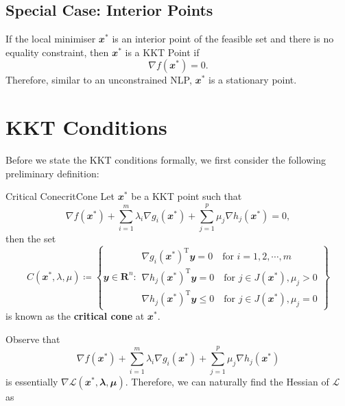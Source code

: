 \documentclass[math, code]{amznotes}
\theoremstyle{remark}
\begin{document}
\subsection{Special Case: Interior Points}
If the local minimiser $\mathbfit{x}^*$ is an interior point of the feasible set and there is no equality constraint, then $\mathbfit{x}^*$ is a KKT Point if 
\begin{equation*}
    \nabla f(\mathbfit{x}^*) = 0.
\end{equation*}
Therefore, similar to an unconstrained NLP, $\mathbfit{x}^*$ is a stationary point.

\section{KKT Conditions}
Before we state the KKT conditions formally, we first consider the following preliminary definition:
\begin{dfnbox}{Critical Cone}{critCone}
    Let $\mathbfit{x}^*$ be a KKT point such that
    \begin{equation*}
        \nabla f(\mathbfit{x}^*) + \sum_{i = 1}^{m}\lambda_i\nabla g_i(\mathbfit{x}^*) + \sum_{j = 1}^{p}\mu_j\nabla h_j(\mathbfit{x}^*) = \mathbfit{0},
    \end{equation*}
    then the set
    \begin{equation*}
        C(\mathbfit{x}^*, \lambda, \mu) \coloneqq \left\{\mathbfit{y} \in \mathbf{R}^n \colon \begin{array}{l}
            \nabla g_i(\mathbfit{x}^*)^{\mathrm{T}}\mathbfit{y} = 0 \quad\textrm{for } i = 1, 2, \cdots, m \\
            \nabla h_j(\mathbfit{x}^*)^{\mathrm{T}}\mathbfit{y} = 0 \quad\textrm{for } j \in J(\mathbfit{x^*}), \mu_j > 0 \\
            \nabla h_j(\mathbfit{x}^*)^{\mathrm{T}}\mathbfit{y} \leq 0 \quad\textrm{for } j \in J(\mathbfit{x^*}), \mu_j = 0
        \end{array}\right\}
    \end{equation*}
    is known as the {\color{red} \textbf{critical cone}} at $\mathbfit{x}^*$.
\end{dfnbox}
Observe that
\begin{equation*}
    \nabla f(\mathbfit{x}^*) + \sum_{i = 1}^{m}\lambda_i\nabla g_i(\mathbfit{x}^*) + \sum_{j = 1}^{p}\mu_j\nabla h_j(\mathbfit{x}^*)
\end{equation*}
is essentially $\nabla \mathcal{L}(\mathbfit{x}^*, \mathbfit{\lambda}, \mathbfit{\mu})$. Therefore, we can naturally find the Hessian of $\mathcal{L}$ as
\end{document}

